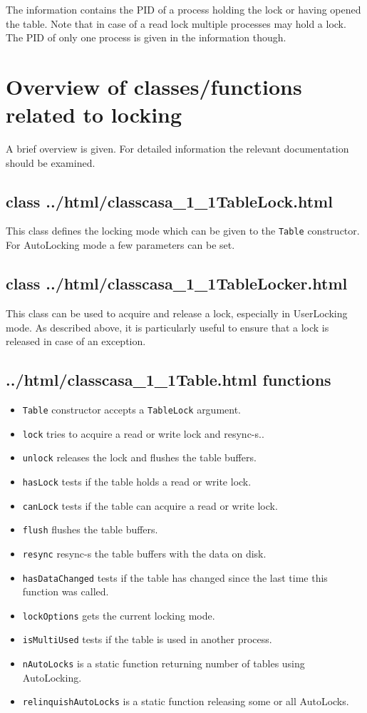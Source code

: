 The information contains the PID of a process holding the lock or
having opened the table. Note that in case of a read lock multiple
processes may hold a lock. The PID of only one process is given
in the information though.


\section{Overview of classes/functions related to locking}
A brief overview is given. For detailed information the relevant
documentation should be examined.

\subsection{class 
{../html/classcasa_1_1TableLock.html}}
This class defines the locking mode which can be given to the \texttt{Table}
constructor. For AutoLocking mode a few parameters can be set.

\subsection{class 
{../html/classcasa_1_1TableLocker.html}}
This class can be used to acquire and release a lock, especially in
UserLocking mode. As described above, it is particularly useful to ensure
that a lock is released in case of an exception.

\subsection{
{../html/classcasa_1_1Table.html} functions}
\begin{itemize}
\item \texttt{Table} constructor accepts a \texttt{TableLock} argument.
\item \texttt{lock} tries to acquire a read or write lock and resync-s..
\item \texttt{unlock} releases the lock and flushes the table buffers.
\item \texttt{hasLock} tests if the table holds a read or write lock.
\item \texttt{canLock} tests if the table can acquire a read or write lock.
\item \texttt{flush} flushes the table buffers.
\item \texttt{resync} resync-s the table buffers with the data on disk.
\item \texttt{hasDataChanged} tests if the table has changed since the
last time this function was called.
\item \texttt{lockOptions} gets the current locking mode.
\item \texttt{isMultiUsed} tests if the table is used in another process.
\item \texttt{nAutoLocks} is a static function returning number of tables
using AutoLocking.
\item \texttt{relinquishAutoLocks} is a static function releasing some
or all AutoLocks.
\end{itemize}

